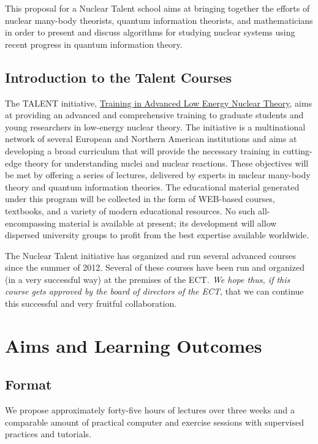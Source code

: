 \documentclass[superscriptaddress,amsmath,amssymb,aps,floatfix]{revtex4-2}
\begin{document}
This proposal for a Nuclear Talent school aims at bringing together
the efforts of nuclear many-body theorists, quantum information
theorists, and mathematicians in order to present and discuss
algorithms for studying nuclear systems using recent progress in
quantum information theory.

\subsection{Introduction to the Talent Courses}

The TALENT initiative, \href{http://www.nucleartalent.org}{Training in
  Advanced Low Energy Nuclear Theory}, aims at providing an advanced
and comprehensive training to graduate students and young researchers
in low-energy nuclear theory. The initiative is a multinational
network of several European and Northern American institutions and
aims at developing a broad curriculum that will provide the necessary
training in cutting-edge theory for understanding nuclei and nuclear
reactions.  These objectives will be met by offering a series of
lectures, delivered by experts in nuclear many-body theory and quantum
information theories.  The educational material generated under this
program will be collected in the form of WEB-based courses, textbooks,
and a variety of modern educational resources. No such
all-encompassing material is available at present; its development
will allow dispersed university groups to profit from the best
expertise available worldwide.

The Nuclear Talent initiative has organized and run several advanced
courses since the summer of 2012. Several of these courses have been run
and organized (in a very successful way) at the premises of the
ECT\emph{. We hope thus, if this course gets approved by the board of
directors of the ECT}, that we can continue this successful and very
fruitful collaboration.

\section{Aims and Learning Outcomes}
\subsection{Format}

We propose approximately forty-five hours of lectures over three weeks
and a comparable amount of practical computer and exercise sessions with
supervised practices and tutorials.
\end{document}

